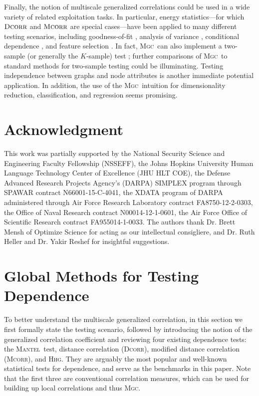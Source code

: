 \documentclass[11pt]{article}
\providecommand{\sct}[1]{{\normalfont\textsc{#1}}}
\newcommand{\Mgc}{\sct{Mgc}}
\newcommand{\Hhg}{\sct{Hhg}}
\newcommand{\Dcorr}{\sct{Dcorr}}
\newcommand{\Mcorr}{\sct{Mcorr}}
\newcommand{\Mantel}{\sct{Mantel}}
\begin{document}
Finally, the notion of multiscale generalized correlations could be used in a wide variety of related exploitation tasks.  In particular, energy statistics---for which $\Dcorr$ and $\Mcorr$ are special cases---have been applied to many different testing scenarios, including goodness-of-fit  \cite{Szekely2005}, analysis of variance  \cite{Rizzo2010}, conditional dependence  \cite{Szekely2014,Wang2015},   and feature selection \cite{LiZhongZhu2012,Zhong2015}.     
In fact, \Mgc~can also implement a two-sample (or generally the $K$-sample) test \cite{Szekely2004, heller2016consistent}; further comparisons of \Mgc~to standard methods for two-sample testing could be illuminating.
Testing independence between graphs and node attributes \cite{Fosdick2015} is another immediate potential application.  In addition, the use of the \Mgc~intuition for dimensionality reduction, classification, and regression seems promising.



\clearpage
\pagestyle{empty}




\section*{Acknowledgment}
This work was partially supported by the
%
National Security Science and Engineering Faculty Fellowship (NSSEFF),
%
the Johns Hopkins University Human Language Technology Center of Excellence (JHU HLT COE),  the
%
Defense Advanced Research Projects Agency's (DARPA) SIMPLEX program through SPAWAR contract N66001-15-C-4041,
%
the XDATA program of DARPA administered through Air Force Research Laboratory contract FA8750-12-2-0303,
%
the Office of Naval Research contract N00014-12-1-0601,
%
the Air Force Office of Scientific Research contract FA955014-1-0033. The authors thank Dr. Brett Mensh of Optimize Science for acting as our intellectual consigliere, and Dr. Ruth Heller and Dr. Yakir Reshef for insightful suggestions.


\clearpage
\appendix
\setcounter{figure}{0}
\renewcommand{\thealgorithm}{C\arabic{algorithm}}
\renewcommand{\thefigure}{E\arabic{figure}}
\renewcommand{\thesubsection}{\thesection.\Roman{subsection}}

\section{Global Methods for Testing Dependence}
\label{appen:global}
To better understand the multiscale generalized correlation, in this section we first formally state the testing scenario, followed by introducing the notion of the generalized correlation coefficient and reviewing four existing dependence tests: the \Mantel~test, distance correlation (\Dcorr), modified distance correlation (\Mcorr), and \Hhg. They are arguably the most popular and well-known statistical tests for dependence, and serve as the benchmarks in this paper. Note that the first three are conventional correlation measures, which can be used for building up local correlations and thus  \Mgc.
\end{document}
